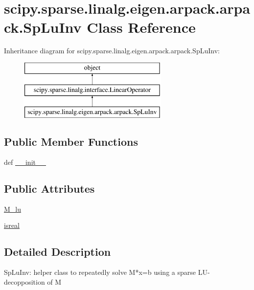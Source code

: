 \hypertarget{classscipy_1_1sparse_1_1linalg_1_1eigen_1_1arpack_1_1arpack_1_1SpLuInv}{}\section{scipy.\+sparse.\+linalg.\+eigen.\+arpack.\+arpack.\+Sp\+Lu\+Inv Class Reference}
\label{classscipy_1_1sparse_1_1linalg_1_1eigen_1_1arpack_1_1arpack_1_1SpLuInv}
Inheritance diagram for scipy.\+sparse.\+linalg.\+eigen.\+arpack.\+arpack.\+Sp\+Lu\+Inv\+:\begin{figure}[H]
\begin{center}
\leavevmode
\includegraphics[height=3.000000cm]{classscipy_1_1sparse_1_1linalg_1_1eigen_1_1arpack_1_1arpack_1_1SpLuInv}
\end{center}
\end{figure}
\subsection*{Public Member Functions}
\begin{DoxyCompactItemize}
\item 
def \hyperlink{classscipy_1_1sparse_1_1linalg_1_1eigen_1_1arpack_1_1arpack_1_1SpLuInv_a65299d8359f738c90a0540314ce94315}{\+\_\+\+\_\+init\+\_\+\+\_\+}
\end{DoxyCompactItemize}
\subsection*{Public Attributes}
\begin{DoxyCompactItemize}
\item 
\hyperlink{classscipy_1_1sparse_1_1linalg_1_1eigen_1_1arpack_1_1arpack_1_1SpLuInv_accde2c0f80f292953aa174b93149fdd6}{M\+\_\+lu}
\item 
\hyperlink{classscipy_1_1sparse_1_1linalg_1_1eigen_1_1arpack_1_1arpack_1_1SpLuInv_a4d5013bf21019a52a10af4962f23c820}{isreal}
\end{DoxyCompactItemize}


\subsection{Detailed Description}
\begin{DoxyVerb}SpLuInv:
   helper class to repeatedly solve M*x=b
   using a sparse LU-decopposition of M
\end{DoxyVerb}
 

